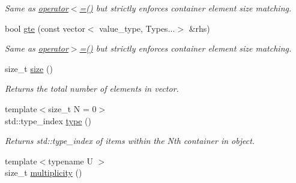 \begin{DoxyCompactItemize}
\begin{DoxyCompactList}\small\item\em Same as \hyperlink{classheterogeneous_1_1vector_3_01_t_00_01_types_8_8_8_4_a7b69b25437440fdd8f76e575fadd06fa}{operator$<$=()} but strictly enforces container element size matching. \end{DoxyCompactList}\item 
\hypertarget{classheterogeneous_1_1vector_3_01_t_00_01_types_8_8_8_4_a3a99afe7a1b97faeb706e78403f76be9}{}bool \hyperlink{classheterogeneous_1_1vector_3_01_t_00_01_types_8_8_8_4_a3a99afe7a1b97faeb706e78403f76be9}{gte} (const vector$<$ value\+\_\+type, Types...$>$ \&rhs)\label{classheterogeneous_1_1vector_3_01_t_00_01_types_8_8_8_4_a3a99afe7a1b97faeb706e78403f76be9}

\begin{DoxyCompactList}\small\item\em Same as \hyperlink{classheterogeneous_1_1vector_3_01_t_00_01_types_8_8_8_4_a49b6e5cbbb934aa63fc84f23ba704cb9}{operator$>$=()} but strictly enforces container element size matching. \end{DoxyCompactList}\item 
\hypertarget{classheterogeneous_1_1vector_3_01_t_00_01_types_8_8_8_4_abeee663545d8bdb15e2403a29ce272e1}{}size\+\_\+t \hyperlink{classheterogeneous_1_1vector_3_01_t_00_01_types_8_8_8_4_abeee663545d8bdb15e2403a29ce272e1}{size} ()\label{classheterogeneous_1_1vector_3_01_t_00_01_types_8_8_8_4_abeee663545d8bdb15e2403a29ce272e1}

\begin{DoxyCompactList}\small\item\em Returns the total number of elements in vector. \end{DoxyCompactList}\item 
\hypertarget{classheterogeneous_1_1vector_3_01_t_00_01_types_8_8_8_4_a6adea46ea5e8549f3be1f1467012863d}{}{\footnotesize template$<$size\+\_\+t N = 0$>$ }\\std\+::type\+\_\+index \hyperlink{classheterogeneous_1_1vector_3_01_t_00_01_types_8_8_8_4_a6adea46ea5e8549f3be1f1467012863d}{type} ()\label{classheterogeneous_1_1vector_3_01_t_00_01_types_8_8_8_4_a6adea46ea5e8549f3be1f1467012863d}

\begin{DoxyCompactList}\small\item\em Returns std\+::type\+\_\+index of items within the Nth container in object. \end{DoxyCompactList}\item 
\hypertarget{classheterogeneous_1_1vector_3_01_t_00_01_types_8_8_8_4_a5c09f0490fad1920ebf1c27169f2d334}{}{\footnotesize template$<$typename U $>$ }\\size\+\_\+t \hyperlink{classheterogeneous_1_1vector_3_01_t_00_01_types_8_8_8_4_a5c09f0490fad1920ebf1c27169f2d334}{multiplicity} ()\label{classheterogeneous_1_1vector_3_01_t_00_01_types_8_8_8_4_a5c09f0490fad1920ebf1c27169f2d334}


\end{DoxyCompactItemize}
